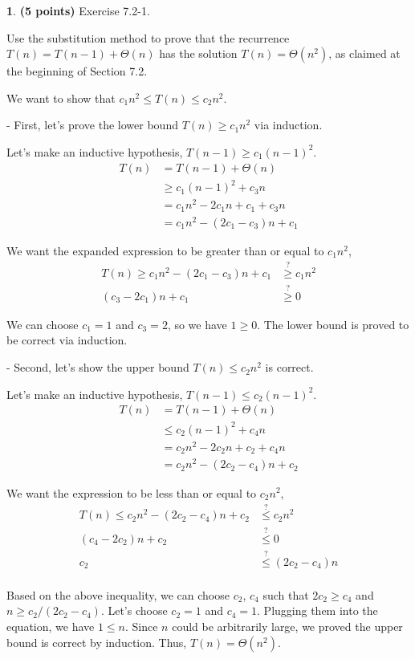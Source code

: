 \documentclass[11pt]{article}
\theoremstyle{definition}
\theoremstyle{theorem}
\newtheorem{prob}{}
\newcommand{\solution}{\medskip\noindent{\color{DarkBlue}\textbf{Solution:}}}
\begin{document}
\newpage
\begin{prob} \textbf{(5 points)} Exercise 7.2-1.

Use the substitution method to prove that the recurrence $T(n) = T(n-1) + \Theta{(n)}$ has the solution $T(n) = \Theta{(n^2)}$, as claimed at the beginning of Section 7.2.

\solution

We want to show that $c_1 n^2 \leq T(n) \leq c_2 n^2$. 

- First, let's prove the lower bound $T(n) \ge c_1 n^2$ via induction. 

Let's make an inductive hypothesis, $T(n-1) \ge c_1(n-1)^2$.
\[
\begin{split}
T(n) &= T(n-1) + \Theta{(n)} \\
& \ge c_1(n-1)^2 + c_3 n \\
&= c_1 n^2 - 2 c_1 n + c_1 + c_3 n \\
&= c_1 n^2 - (2c_1 - c_3)n + c_1
\end{split}
\]

We want the expanded expression to be greater than or equal to $c_1n^2$,
\[
\begin{split}
T(n) \ge c_1 n^2 - (2c_1 - c_3)n + c_1 &\stackrel{?}{\ge} c_1 n^2 \\
(c_3 - 2c_1)n + c_1 &\stackrel{?}{\ge} 0
\end{split}
\]

We can choose $c_1 = 1$ and $c_3 = 2$, so we have $1 \ge 0$. The lower bound is proved to be correct via induction.

- Second, let's show the upper bound $T(n) \leq c_2 n^2$ is correct.

Let's make an inductive hypothesis, $T(n-1) \leq c_2 (n-1)^2$.
\[
\begin{split}
T(n) &= T(n-1) + \Theta{(n)} \\
& \leq c_2 (n-1)^2 + c_4 n \\
&= c_2 n^2 - 2 c_2 n + c_2 + c_4 n \\
&= c_2 n^2 - (2c_2 - c_4)n + c_2
\end{split}
\]

We want the expression to be less than or equal to $c_2 n^2$,
\[
\begin{split}
T(n) \leq c_2 n^2 - (2c_2 - c_4)n + c_2 &\stackrel{?}{\leq} c_2 n^2 \\
(c_4 - 2c_2)n + c_2 &\stackrel{?}{\leq} 0 \\
c_2 &\stackrel{?}{\leq} (2c_2 - c_4)n \\
\end{split}
\]

Based on the above inequality, we can choose $c_2$, $c_4$ such that $2 c_2 \ge c_4$ and $n \ge c_2/(2c_2 - c_4)$. Let's choose $c_2 = 1$ and $c_4 = 1$. Plugging them into the equation, we have $1 \leq n$. Since $n$ could be arbitrarily large, we proved the upper bound is correct by induction. Thus, $T(n) = \Theta{(n^2)}$.
\end{prob}
\end{document}
